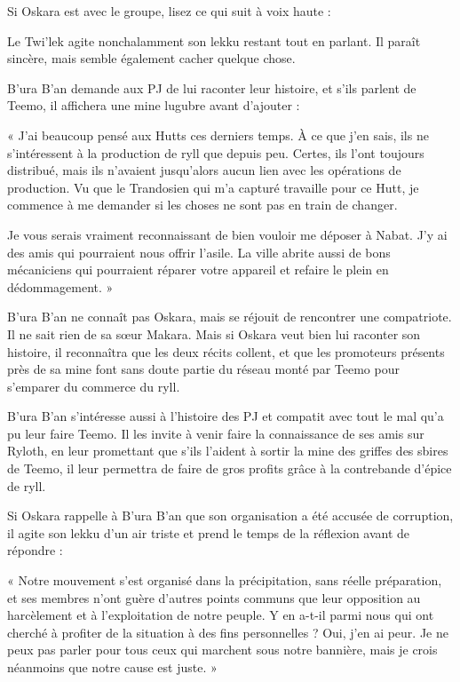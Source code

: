 \documentclass[a4paper,10pt,twoside,twocolumn,openany]{book}
\begin{document}
Si Oskara est avec le groupe, lisez ce qui suit à voix
haute :

\begin{quotebox}
    
Le Twi’lek agite nonchalamment son lekku restant
tout en parlant. Il paraît sincère, mais semble également cacher quelque chose.
\end{quotebox}


B’ura B’an demande aux PJ de lui raconter leur histoire, et s’ils parlent de Teemo, il affichera une mine lugubre avant d’ajouter :
\begin{quotebox}
    
« J’ai beaucoup pensé aux Hutts ces derniers
temps. À ce que j’en sais, ils ne s’intéressent à la
production de ryll que depuis peu. Certes, ils l’ont
toujours distribué, mais ils n’avaient jusqu’alors
aucun lien avec les opérations de production. Vu
que le Trandosien qui m’a capturé travaille pour ce
Hutt, je commence à me demander si les choses
ne sont pas en train de changer.

Je vous serais vraiment reconnaissant de bien
vouloir me déposer à Nabat. J’y ai des amis qui
pourraient nous offrir l’asile. La ville abrite aussi
de bons mécaniciens qui pourraient réparer votre
appareil et refaire le plein en dédommagement. »
\end{quotebox}

B’ura B’an ne connaît pas Oskara, mais se réjouit de
rencontrer une compatriote. Il ne sait rien de sa sœur
Makara. Mais si Oskara veut bien lui raconter son histoire, il reconnaîtra que les deux récits collent, et que les
promoteurs présents près de sa mine font sans doute
partie du réseau monté par Teemo pour s’emparer du
commerce du ryll.

B’ura B’an s’intéresse aussi à l’histoire des PJ et compatit avec tout le mal qu’a pu leur faire Teemo. Il les invite à venir faire la connaissance de ses amis sur Ryloth,
en leur promettant que s’ils l’aident à sortir la mine des
griffes des sbires de Teemo, il leur permettra de faire de
gros profits grâce à la contrebande d’épice de ryll.

Si Oskara rappelle à B’ura B’an que son organisation a
été accusée de corruption, il agite son lekku d’un air triste
et prend le temps de la réflexion avant de répondre :
\begin{quotebox}
    
« Notre mouvement s’est organisé dans la précipitation, sans réelle préparation, et ses membres
n’ont guère d’autres points communs que leur
opposition au harcèlement et à l’exploitation de
notre peuple. Y en a-t-il parmi nous qui ont cherché
à profiter de la situation à des fins personnelles ?
Oui, j’en ai peur. Je ne peux pas parler pour tous
ceux qui marchent sous notre bannière, mais je
crois néanmoins que notre cause est juste. »\end{quotebox}
\end{document}
